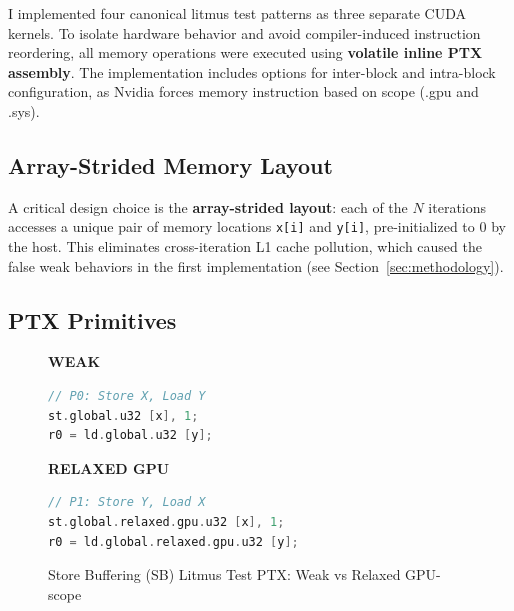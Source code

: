 \documentclass[a4paper]{article}
\begin{document}
I implemented four canonical litmus test patterns as three separate CUDA kernels. To isolate hardware behavior and avoid compiler-induced instruction reordering, all memory operations were executed using \textbf{volatile inline PTX assembly}. The implementation includes options for inter-block and intra-block configuration, as Nvidia forces memory instruction based on scope (.gpu and .sys). 

\subsection{Array-Strided Memory Layout}

A critical design choice is the \textbf{array-strided layout}: each of the $N$ iterations accesses a unique pair of memory locations \texttt{x[i]} and \texttt{y[i]}, pre-initialized to 0 by the host.
This eliminates cross-iteration L1 cache pollution, which caused the false weak behaviors in the first implementation (see Section~\ref{sec:methodology}).

\subsection{PTX Primitives}

\begin{figure}[h]
\centering
\begin{minipage}{0.45\textwidth}
\centering
\textbf{WEAK}
\begin{lstlisting}[language=C]
// P0: Store X, Load Y
st.global.u32 [x], 1;
r0 = ld.global.u32 [y];
\end{lstlisting}
\end{minipage}
\hfill
\begin{minipage}{0.45\textwidth}
\centering
\textbf{RELAXED GPU}
\begin{lstlisting}[language=C]
// P1: Store Y, Load X
st.global.relaxed.gpu.u32 [x], 1;
r0 = ld.global.relaxed.gpu.u32 [y];
\end{lstlisting}
\end{minipage}
\caption{Store Buffering (SB) Litmus Test PTX: Weak vs Relaxed GPU-scope}
\end{figure}
\end{document}
